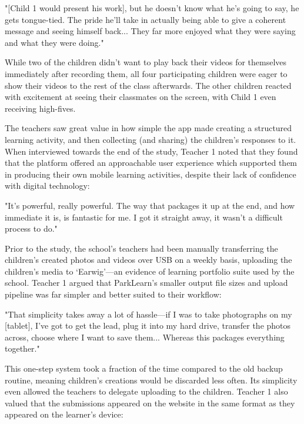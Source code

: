 \begin{displayquote}
"[Child 1 would present his work], but he doesn't know what he’s going to say, he gets tongue-tied. The pride he’ll take in actually being able to give a coherent message and seeing himself back... They far more enjoyed what they were saying and what they were doing."
\end{displayquote}

While two of the children didn’t want to play back their videos for themselves immediately after recording them, all four participating children were eager to show their videos to the rest of the class afterwards. The other children reacted with excitement at seeing their classmates on the screen, with Child 1 even receiving high-fives.

The teachers saw great value in how simple the app made creating a structured learning activity, and then  collecting (and sharing) the children’s responses to it. When interviewed towards the end of the study, Teacher 1 noted that they found that the platform offered an approachable user experience which supported them in producing their own mobile learning activities, despite their lack of confidence with digital technology:

\begin{displayquote}
"It’s powerful, really powerful. The way that packages it up at the end, and how immediate it is, is fantastic for me. I got it straight away, it wasn't a difficult process to do."
\end{displayquote}

Prior to the study, the school’s teachers had been manually transferring the children’s created photos and videos over USB on a weekly basis, uploading the children’s media to `Earwig'---an evidence of learning portfolio suite used by the school. Teacher 1 argued that ParkLearn’s smaller output file sizes and upload pipeline was far simpler and better suited to their workflow:

\begin{displayquote}
"That simplicity takes away a lot of hassle---if I was to take photographs on my [tablet], I've got to get the lead, plug it into my hard drive, transfer the photos across, choose where I want to save them... Whereas this packages everything together."
\end{displayquote}

This one-step system took a fraction of the time compared to the old backup routine, meaning children’s creations would be discarded less often. Its simplicity even allowed the teachers to delegate uploading to the children. Teacher 1 also valued that the submissions appeared on the website in the same format as they appeared on the learner’s device: 

